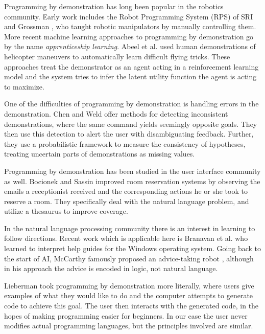 \documentclass[letterpaper]{article}
\begin{document}
Programming by demonstration has long been popular in the robotics community.
Early work includes the Robot Programming System (RPS) of SRI \cite{SRIpbd} and
Grossman \cite{grossman}, who taught robotic manipulators by manually controlling them.
More recent machine learning approaches to programming by demonstration 
go by the name \emph{apprenticeship learning}.
Abeel et al. \cite{Abbeel:2004:ALV:1015330.1015430} used human demonstrations of helicopter maneuvers to automatically learn difficult flying tricks. These approaches treat the demonstrator as an agent
acting in a reinforcement learning model and the system tries to infer the latent utility function
the agent is acting to maximize.

One of the difficulties of programming by demonstration is handling errors in 
the demonstration. Chen and Weld \cite{Chen:2008:RED:1378773.1378794} offer methods for
detecting inconsistent demonstrations, where the same command yields seemingly opposite
goals. They then use this detection to alert the user with disambiguating feedback.
Further, they use a probabilistic framework to measure the consistency of hypotheses,
treating uncertain parts of demonstrations as missing values.

Programming by demonstration has been studied in the user interface community as well.
Bocionek and Sassin \cite{Bocionek:1993:DLA:865219} improved room reservation systems
by observing the emails a receptionist received and the corresponding actions
he or she took to reserve a room. They specifically deal with the natural language problem,
and utilize a thesaurus to improve coverage.

In the natural language processing community there is an interest in learning to 
follow directions. Recent work which is applicable here is Branavan et al. 
\cite{DBLP:conf/acl/BranavanCZB09} who learned to interpret help guides for the 
Windows operating system. Going back to the start of AI, McCarthy famously
proposed an advice-taking robot \cite{McCarthy68programswith}, although in his approach
the advice is encoded in logic, not natural language.

Lieberman \cite{lieberman2001} took programming by demonstration more literally, where users give examples
of what they would like to do and the computer attempts to generate code to 
achieve this goal. The user then interacts with the generated code, in the hopes
of making programming easier for beginners. In our case the user never 
modifies actual programming languages, but the principles involved are similar.
\end{document}
